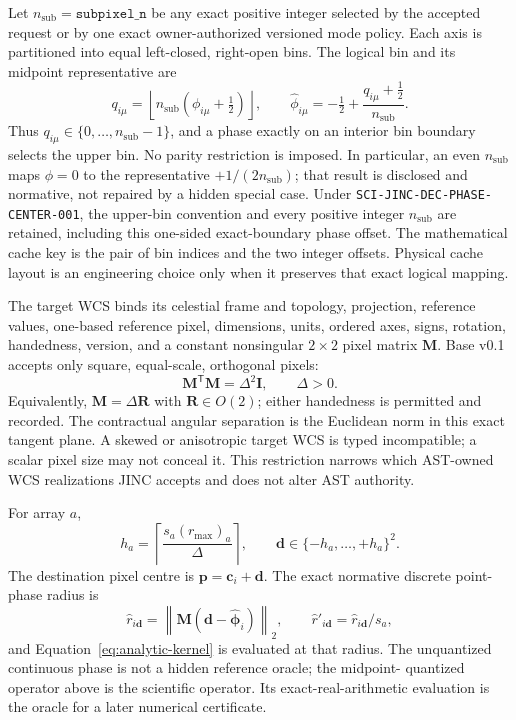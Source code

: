 \documentclass[11pt]{article}
\begin{document}
Let $n_{\mathrm{sub}}=\texttt{subpixel\_n}$ be any exact positive integer selected by
the accepted request or by one exact owner-authorized versioned mode policy.
Each axis is partitioned into equal left-closed, right-open bins.  The logical
bin and its midpoint representative are
\[
 q_{i\mu}=\left\lfloor n_{\mathrm{sub}}
      (\phi_{i\mu}+\tfrac12)\right\rfloor,
 \qquad
 \widehat\phi_{i\mu}=-\tfrac12+
      \frac{q_{i\mu}+\tfrac12}{n_{\mathrm{sub}}}.
\]
Thus $q_{i\mu}\in\{0,\ldots,n_{\mathrm{sub}}-1\}$, and a phase exactly on an interior
bin boundary selects the upper bin.  No parity restriction is imposed.  In
particular, an even $n_{\mathrm{sub}}$ maps $\phi=0$ to the representative
$+1/(2n_{\mathrm{sub}})$; that result is disclosed and normative, not repaired by a
hidden special case.  Under \texttt{SCI-JINC-DEC-PHASE-CENTER-001}, the
upper-bin convention and every positive integer $n_{\mathrm{sub}}$ are
retained, including this one-sided exact-boundary phase offset.  The
mathematical cache key is the pair of bin indices
and the two integer offsets.  Physical cache layout is an engineering choice
only when it preserves that exact logical mapping.

The target WCS binds its celestial frame and topology, projection, reference
values, one-based reference pixel, dimensions, units, ordered axes, signs,
rotation, handedness, version, and a constant nonsingular $2\times2$ pixel
matrix $\mathbf M$.  Base v0.1 accepts only square, equal-scale, orthogonal
pixels:
\[
 \mathbf M^{\mathsf T}\mathbf M=\Delta^2\mathbf I,
 \qquad \Delta>0.
\]
Equivalently, $\mathbf M=\Delta\mathbf R$ with
$\mathbf R\in O(2)$; either handedness is permitted and recorded.  The
contractual angular separation is the Euclidean norm in this exact tangent
plane.  A skewed or anisotropic target WCS is typed incompatible; a scalar
pixel size may not conceal it.  This restriction narrows which AST-owned WCS
realizations JINC accepts and does not alter AST authority.

For array $a$,
\[
 h_a=\left\lceil\frac{s_a(r_{\max})_a}{\Delta}\right\rceil,
 \qquad
 \boldsymbol d\in\{-h_a,\ldots,+h_a\}^2.
\]
The destination pixel centre is
$\boldsymbol p=\boldsymbol c_i+\boldsymbol d$.  The exact normative discrete
point-phase radius is
\[
 \widehat r_{i\boldsymbol d}
   =\left\lVert\mathbf M
      (\boldsymbol d-\widehat{\boldsymbol\phi}_i)\right\rVert_2,
 \qquad
 \widehat r'_{i\boldsymbol d}=\widehat r_{i\boldsymbol d}/s_a,
\]
and Equation~\eqref{eq:analytic-kernel} is evaluated at that radius.  The
unquantized continuous phase is not a hidden reference oracle; the midpoint-
quantized operator above is the scientific operator.  Its exact-real-arithmetic
evaluation is the oracle for a later numerical certificate.
\end{document}
